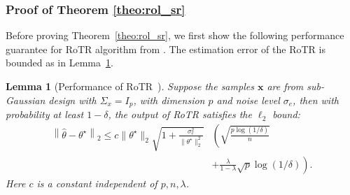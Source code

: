 \documentclass[11pt]{article}
\newtheorem{lemma}{Lemma}
\begin{document}
\subsubsection{Proof of Theorem \ref{theo:rol_sr}}
Before proving Theorem~\ref{theo:rol_sr}, we first show the following performance guarantee for RoTR algorithm from \cite{chen2013robust}.
The estimation error of the RoTR is bounded as in Lemma~\ref{lemma:RoTR}.
\begin{lemma}[Performance of RoTR~\cite{chen2013robust}]
	\label{lemma:RoTR}
	Suppose the samples $ \mathbf{x} $ are from sub-Gaussian design with $\Sigma_x = I_p$, with dimension $ p $ and noise level $ \sigma_e $, then with probability at least $1-\delta$, the output of RoTR satisfies the $\ell_2$ bound:
	\begin{align*}
	\left\|\widehat{\theta}-\theta^\star \right\|_2 \leq c\|\theta^\star\|_2\sqrt{1+\frac{\sigma_e^2}{\|\theta^\star\|_2^2}}& \left(\sqrt{\frac{p\log (1/\delta)}{n}} \right. \\
	& \left. + \frac{\lambda}{1-\lambda}\sqrt{p}\log (1/\delta)\right).
	\end{align*}
	Here $c$ is a constant independent of $p,n,\lambda$.
\end{lemma}

\end{document}
